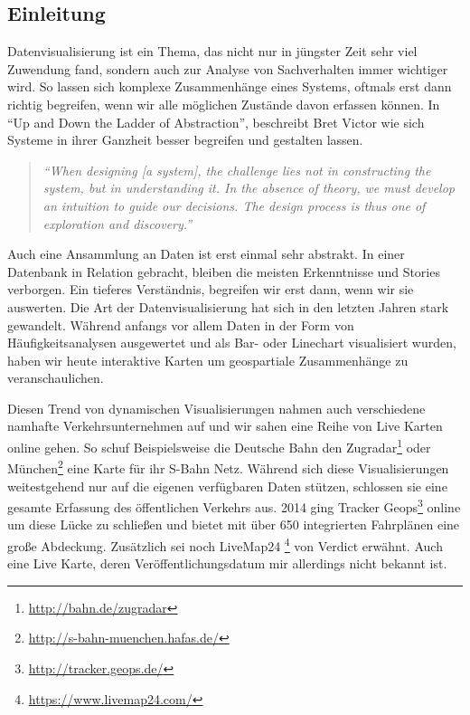 
\begin{newpage}
	
	\section{Einleitung}
		
	\label{sec:Einleitung}
		Datenvisualisierung ist ein Thema, das nicht nur in jüngster Zeit sehr viel Zuwendung fand, sondern auch zur Analyse von Sachverhalten immer wichtiger wird. So lassen sich komplexe Zusammenhänge eines Systems, oftmals erst dann richtig begreifen, wenn wir alle möglichen Zustände davon erfassen können. In "`Up and Down the Ladder of Abstraction"', beschreibt Bret Victor wie sich Systeme in ihrer Ganzheit besser begreifen und gestalten lassen.

		\begin{quote}
			\emph{"`When designing [a system], the challenge lies not in constructing the system, but in understanding it. In the absence of theory, we must develop an intuition to guide our decisions. The design process is thus one of exploration and discovery."'} \parencite{victor}
		\end{quote}

		Auch eine Ansammlung an Daten ist erst einmal sehr abstrakt. In einer Datenbank in Relation gebracht, bleiben die meisten Erkenntnisse und Stories verborgen. Ein tieferes Verständnis, begreifen wir erst dann, wenn wir sie auswerten. Die Art der Datenvisualisierung hat sich in den letzten Jahren stark gewandelt. Während anfangs vor allem Daten in der Form von Häufigkeitsanalysen ausgewertet und als Bar- oder Linechart visualisiert wurden, haben wir heute interaktive Karten um geospartiale Zusammenhänge zu veranschaulichen.

		Diesen Trend von dynamischen Visualisierungen nahmen auch verschiedene namhafte Verkehrsunternehmen auf und wir sahen eine Reihe von Live Karten online gehen. So schuf Beispielsweise die Deutsche Bahn den Zugradar\footnote{\url{http://bahn.de/zugradar}} oder München\footnote{\url{http://s-bahn-muenchen.hafas.de/}} eine Karte für ihr S-Bahn Netz. Während sich diese Visualisierungen weitestgehend nur auf die eigenen verfügbaren Daten stützen, schlossen sie eine gesamte Erfassung des öffentlichen Verkehrs aus. 2014 ging Tracker Geops\footnote{\url{http://tracker.geops.de/}} online um diese Lücke zu schließen und bietet mit über 650 integrierten Fahrplänen eine große Abdeckung. Zusätzlich sei noch LiveMap24 \footnote{\url{https://www.livemap24.com/}} von Verdict erwähnt. Auch eine Live Karte, deren Veröffentlichungsdatum mir allerdings nicht bekannt ist.


\end{newpage}
